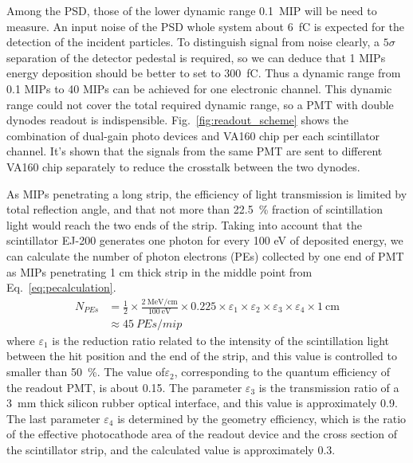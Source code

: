\documentclass[5p, times]{elsarticle}
\begin{document}
Among the PSD, those of the lower dynamic range \SI{0.1}{MIP} will be need to measure. 
An input noise of the PSD whole system about \SI{6}{\femto\coulomb} is expected for the detection of the incident particles. 
To distinguish signal from noise clearly, a $5\sigma$ separation of the detector pedestal is required, so we can deduce that 1 MIPs energy deposition should be better to set to \SI{300}{\femto\coulomb}. 
Thus a dynamic range from 0.1 MIPs to 40 MIPs can be achieved for one electronic channel.
This dynamic range could not cover the total required dynamic range, so a PMT with double dynodes readout is indispensible. 
Fig.~\ref{fig:readout_scheme} shows the combination of dual-gain photo devices and VA160 chip per each scintillator channel.
It’s shown that the signals from the same PMT are sent to different VA160 chip separately to reduce the crosstalk between the two dynodes.

As MIPs penetrating a long strip, the efficiency of light transmission is limited by total reflection angle, and that not more than \SI{22.5}{\percent} fraction of scintillation light would reach the two ends of the strip. 
Taking into account that the scintillator EJ-200 generates one photon for every 100 eV of deposited energy, we can calculate the number of photon electrons (PEs) collected by one end of PMT as MIPs penetrating 1 cm thick strip in the middle point from Eq.~\ref{eq:pecalculation}.
\begin{align}
 N_{PEs} &= \frac{1}{2} \times \frac{\SI[per-mode=symbol]{2}{\mega\electronvolt\per\centi\meter}}{\SI{100}{\electronvolt}} \times 0.225
           \times \varepsilon_{1} \times \varepsilon_{2} \times \varepsilon_{3} \times \varepsilon_{4} \times \SI{1}{\centi\meter} \nonumber \\
         &\approx \SI{45}{PEs/mip}
\label{eq:pecalculation}
\end{align} 
where $\varepsilon_1$ is the reduction ratio related to the intensity of the scintillation light between the hit position and the end of the strip, and this value is controlled to smaller than \SI{50}{\percent}.
The value of$\varepsilon_2$, corresponding to the quantum efficiency of the readout PMT, is about 0.15. 
The parameter $\varepsilon_3$ is the transmission ratio of a \SI{3}{\milli\meter} thick silicon rubber optical interface, and this value is approximately 0.9. 
The last parameter $\varepsilon_4$ is determined by the geometry efficiency, which is the ratio of the effective photocathode area of the readout device and the cross section of the scintillator strip, and the calculated value is approximately 0.3.
\end{document}
